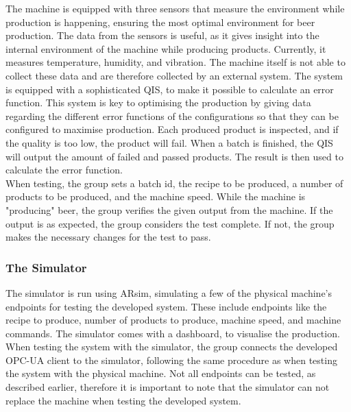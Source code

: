 The machine is equipped with three sensors that measure the environment while
production is happening, ensuring the most optimal environment for beer
production. The data from the sensors is useful, as it gives insight into the
internal environment of the machine while producing products. Currently, it
measures temperature, humidity, and vibration. The machine itself is not able to
collect these data and are therefore collected by an external system. The system
is equipped with a sophisticated QIS, to make it possible to calculate an error
function. This system is key to optimising the production by giving data
regarding the different error functions of the configurations so that they can
be configured to maximise production. Each produced product is inspected, and if
the quality is too low, the product will fail. When a batch is finished, the QIS
will output the amount of failed and passed products. The result is then used to
calculate the error function. \\

When testing, the group sets a batch id, the recipe to be produced, a number of
products to be produced, and the machine speed. While the machine is "producing"
beer, the group verifies the given output from the machine. If the output is as
expected, the group considers the test complete. If not, the group makes the
necessary changes for the test to pass. 


\subsubsection{The Simulator}
The simulator is run using ARsim, simulating a few of the physical machine's
endpoints for testing the developed system. These include endpoints like the
recipe to produce, number of products to produce, machine speed, and machine
commands. The simulator comes with a dashboard, to visualise the production. \\

When testing the system with the simulator, the group connects the developed
OPC-UA client to the simulator, following the same procedure as when testing
the system with the physical machine. Not all endpoints can be tested, as
described earlier, therefore it is important to note that the simulator can not
replace the machine when testing the developed system.
